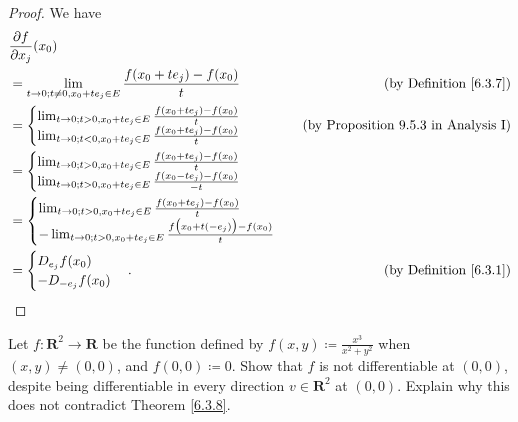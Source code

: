 \begin{proof}
    We have
    \begin{align*}
         & \frac{\partial f}{\partial x_j}(x_0)                                                                                           \\
         & = \lim_{t \to 0 ; t \neq 0, x_0 + t e_j \in E} \frac{f(x_0 + t e_j) - f(x_0)}{t} & \text{(by Definition \ref{6.3.7})}          \\
         & = \begin{cases}
            \lim_{t \to 0 ; t > 0, x_0 + t e_j \in E} \frac{f(x_0 + t e_j) - f(x_0)}{t} \\
            \lim_{t \to 0 ; t < 0, x_0 + t e_j \in E} \frac{f(x_0 + t e_j) - f(x_0)}{t}
        \end{cases}                                                     & \text{(by Proposition 9.5.3 in Analysis I)} \\
         & = \begin{cases}
            \lim_{t \to 0 ; t > 0, x_0 + t e_j \in E} \frac{f(x_0 + t e_j) - f(x_0)}{t} \\
            \lim_{t \to 0 ; t > 0, x_0 + t e_j \in E} \frac{f(x_0 - t e_j) - f(x_0)}{-t}
        \end{cases}                                                                                                   \\
         & = \begin{cases}
            \lim_{t \to 0 ; t > 0, x_0 + t e_j \in E} \frac{f(x_0 + t e_j) - f(x_0)}{t} \\
            -\lim_{t \to 0 ; t > 0, x_0 + t e_j \in E} \frac{f\big(x_0 + t (-e_j)\big) - f(x_0)}{t}
        \end{cases}                                                                                                   \\
         & = \begin{cases}
            D_{e_j} f(x_0) \\
            - D_{-e_j} f(x_0)
        \end{cases}.                                                    & \text{(by Definition \ref{6.3.1})}
    \end{align*}
\end{proof}

\begin{exercise}\label{ex 6.3.3}
    Let \(f : \mathbf{R}^2 \to \mathbf{R}\) be the function defined by \(f(x, y) \coloneqq \frac{x^3}{x^2 + y^2}\) when \((x, y) \neq (0, 0)\), and \(f(0, 0) \coloneqq 0\).
    Show that \(f\) is not differentiable at \((0, 0)\), despite being differentiable in every direction \(v \in \mathbf{R}^2\) at \((0, 0)\).
    Explain why this does not contradict Theorem \ref{6.3.8}.
\end{exercise}

